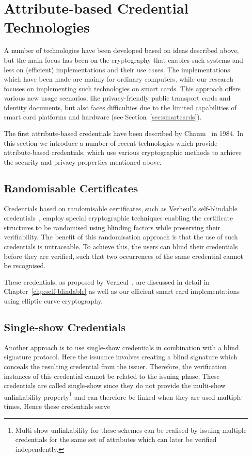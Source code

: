 \section{Attribute-based Credential Technologies}

A number of technologies have been developed based on ideas described above, but
the main focus has been on the cryptography that enables such systems and less
on (efficient) implementations and their use cases. The implementations which
have been made are mainly for ordinary computers, while our research focuses on
implementing such technologies on smart cards. This approach offers various new
usage scenarios, like privacy-friendly public transport cards and identity
documents, but also faces difficulties due to the limited capabilities of smart
card platforms and hardware (see Section~\ref{sec:smartcards}).

The first attribute-based credentials have been described by
Chaum~\cite{Chaum1985} in 1984. In this section we introduce a number of recent
technologies which provide attribute-based credentials, which use various
cryptographic methods to achieve the security and privacy properties mentioned
above.

\subsection{Randomisable Certificates}

Credentials based on randomisable certificates, such as Verheul's self-blindable
credentials~\cite{Verheul01}, employ special cryptographic techniques enabling
the certificate structures to be randomised using blinding factors while
preserving their verifiability. The benefit of this randomisation approach is
that the use of such credentials is untraceable. To achieve this, the users can
blind their credentials before they are verified, such that two occurrences of
the same credential cannot be recognised.

These credentials, as proposed by Verheul~\cite{Verheul01}, are discussed in
detail in Chapter~\ref{chp:self-blindable} as well as our efficient smart card
implementations~\cite{BatinaHJMV10,HoepmanJV10} using elliptic curve
cryptography.

\subsection{Single-show Credentials}

Another approach is to use single-show credentials in combination with a
blind signature protocol. Here the issuance involves creating a blind signature
which conceals the resulting credential from the issuer. Therefore, the
verification instances of this credential cannot be related to the issuing
phase. These credentials are called single-show since they do not provide the
multi-show unlinkability property\footnote{Multi-show unlinkability for these
schemes can be realised by issuing multiple credentials for the same set of
attributes which can later be verified independently.} and can therefore be
linked when they are used multiple times. Hence these credentials serve

